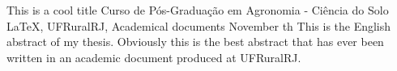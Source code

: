 \documentclass[tese]{UFRuralRJ}
\begin{document}
\generalabstracttrue
\begin{englishabstract}
{This is a cool title}                                   %
{Curso de Pós-Graduação em Agronomia - Ciência do Solo}  %
{LaTeX, UFRuralRJ, Academical documents}                 %
{November}                                               %
{th}                                                     %
This is the English abstract of my thesis. Obviously this is the best abstract 
that has ever been written in an academic document produced at UFRuralRJ.
\end{englishabstract}
\listoffigures                         %
\listofappendix                        %
\tableofcontents                       %
\setlength{\baselineskip}{1.5\baselineskip}
\end{document}
